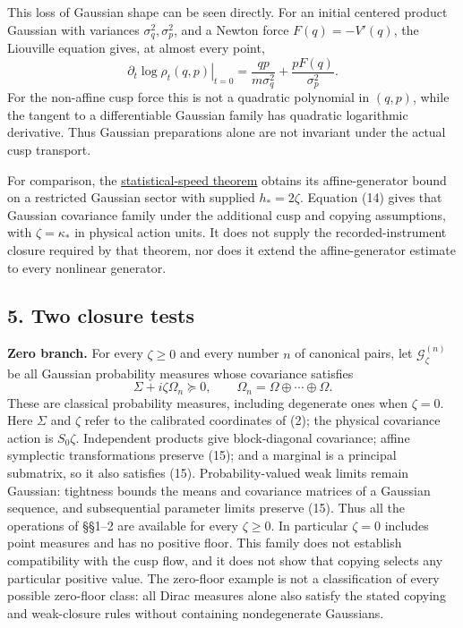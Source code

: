 \documentclass[11pt,a4paper]{article}
\begin{document}
This loss of Gaussian shape can be seen directly. For an initial
centered product Gaussian with variances \(\sigma_q^2,\sigma_p^2\), and
a Newton force \(F(q)=-V'(q)\), the Liouville equation gives, at almost
every point, \[
 \left.\partial_t\log\rho_t(q,p)\right|_{t=0}
 =\frac{qp}{m\sigma_q^2}+\frac{pF(q)}{\sigma_p^2}.\tag{14b}
\] For the non-affine cusp force this is not a quadratic polynomial in
\((q,p)\), while the tangent to a differentiable Gaussian family has
quadratic logarithmic derivative. Thus Gaussian preparations alone are
not invariant under the actual cusp transport.

For comparison, the
\href{newton-indeterminacy-routes.md}{statistical-speed theorem} obtains
its affine-generator bound on a restricted Gaussian sector with supplied
\(h_*=2\zeta\). Equation (14) gives that Gaussian covariance family
under the additional cusp and copying assumptions, with
\(\zeta=\kappa_*\) in physical action units. It does not supply the
recorded-instrument closure required by that theorem, nor does it extend
the affine-generator estimate to every nonlinear generator.

\hypertarget{two-closure-tests}{%
\subsection{5. Two closure tests}\label{two-closure-tests}}

\textbf{Zero branch.} For every \(\zeta\ge0\) and every number \(n\) of
canonical pairs, let \(\mathcal G_\zeta^{(n)}\) be all Gaussian
probability measures whose covariance satisfies
\[\Sigma+i\zeta\Omega_n\succeq0,\qquad
 \Omega_n=\Omega\oplus\cdots\oplus\Omega.\tag{15}\] These are classical
probability measures, including degenerate ones when \(\zeta=0\). Here
\(\Sigma\) and \(\zeta\) refer to the calibrated coordinates of (2); the
physical covariance action is \(S_0\zeta\). Independent products give
block-diagonal covariance; affine symplectic transformations preserve
(15); and a marginal is a principal submatrix, so it also satisfies
(15). Probability-valued weak limits remain Gaussian: tightness bounds
the means and covariance matrices of a Gaussian sequence, and
subsequential parameter limits preserve (15). Thus all the operations of
§§1--2 are available for every \(\zeta\ge0\). In particular \(\zeta=0\)
includes point measures and has no positive floor. This family does not
establish compatibility with the cusp flow, and it does not show that
copying selects any particular positive value. The zero-floor example is
not a classification of every possible zero-floor class: all Dirac
measures alone also satisfy the stated copying and weak-closure rules
without containing nondegenerate Gaussians.
\end{document}
